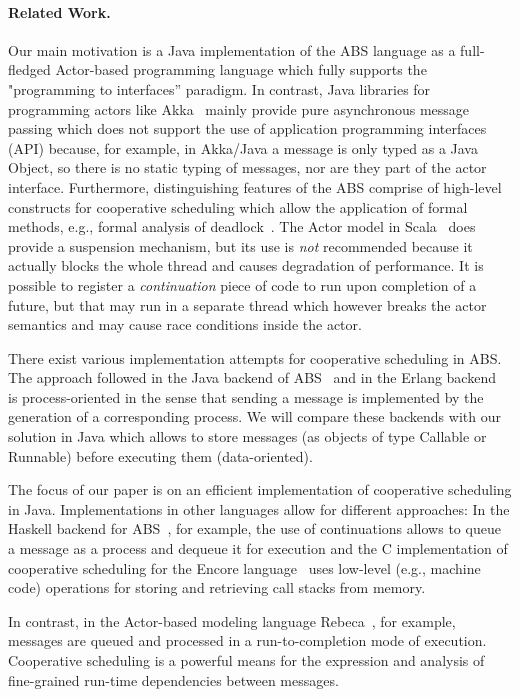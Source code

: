 \paragraph{Related Work.} 
Our main motivation is a Java implementation of the ABS language as a full-fledged Actor-based programming language which fully supports the "programming to interfaces'' paradigm.
In contrast, Java libraries for programming actors like Akka~\cite{Akka} mainly provide pure asynchronous message passing which does not support the use of application programming interfaces (API) because, for example, in Akka/Java a message is only typed as a Java Object, so there is no static typing of messages, nor are they part of the actor interface.
Furthermore, distinguishing features of the ABS comprise of high-level constructs for cooperative scheduling which allow the application of formal methods, e.g.,
formal analysis of deadlock~\cite{deadlock}.
The Actor model in Scala~\cite{Scala} does provide a suspension mechanism, but its use is \emph{not} recommended because it actually blocks the whole thread and causes
degradation of performance.
It is possible to register a {\em continuation} piece of code to run upon completion of a future, but that may run in a separate thread which however breaks the actor semantics and may cause race conditions inside the actor.

There exist various implementation attempts for cooperative scheduling in ABS.
The approach followed in the Java backend of ABS~\cite{abs,Schafer} and in the Erlang backend~\cite{Erlang} is process-oriented in the sense that sending a message is implemented by the generation of a corresponding process. We will compare these backends with our solution in Java which allows to store messages (as objects of type Callable or Runnable) before executing them (data-oriented).

The focus of our paper is on an efficient implementation of cooperative scheduling in Java.
Implementations in other languages allow for different approaches:
In the Haskell backend for ABS~\cite{Haskell}, for example, the use of continuations allows
to queue a message as a process and dequeue it for execution and the C implementation of cooperative scheduling for the
Encore language~\cite{Encore} uses low-level (e.g., machine code) operations for
storing and retrieving call stacks from memory.

In contrast, in the Actor-based modeling language Rebeca~\cite{Sirjani}, for example,
messages are queued and processed in a run-to-completion mode of execution.
Cooperative scheduling is a powerful means for the expression and analysis
of fine-grained run-time dependencies between messages.

